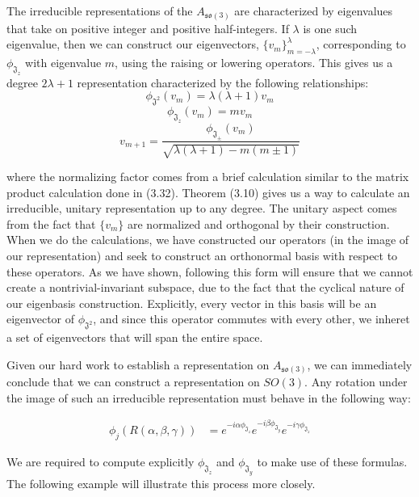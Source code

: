 \begin{theorem}
	The irreducible representations of the $A_{\mathfrak{so}(3)}$ are characterized by eigenvalues that take on positive integer and positive half-integers. If $\lambda$ is one such eigenvalue, then we can construct our eigenvectors, $\{v_m\}_{m=-\lambda}^\lambda$, corresponding to $\phi_{\mathfrak{J}_z}$ with eigenvalue $m$, using the raising or lowering operators. This gives us a degree $2\lambda +1$ representation characterized by the following relationships:
$$\phi_{\mathfrak{J}^2}(v_m) = \lambda(\lambda+1)v_m$$
$$\phi_{\mathfrak{J}_z}(v_m) =  mv_m$$ 
$$v_{m+1} =  \frac{\phi_{\mathfrak{J}_\pm}(v_m)}{\sqrt{\lambda(\lambda+1) - m(m\pm 1)}}$$
\end{theorem}
\noindent where the normalizing factor comes from a brief calculation similar to the matrix product calculation done in (3.32). Theorem (3.10) gives us a way to calculate an irreducible, unitary representation up to any degree. The unitary aspect comes from the fact that $\{v_m\}$ are normalized and orthogonal by their construction. When we do the calculations, we have constructed our operators (in the image of our representation) and seek to construct an orthonormal basis with respect to these operators. As we have shown, following this form will ensure that we cannot create a nontrivial-invariant subspace, due to the fact that the cyclical nature of our eigenbasis construction. Explicitly, every vector in this basis will be an eigenvector of $\phi_{\mathfrak{J^2}}$, and since this operator commutes with every other, we inheret a set of eigenvectors that will span the entire space.

Given our hard work to establish a representation on $A_{\mathfrak{so}(3)}$, we can immediately conclude that we can construct a representation on $SO(3)$. Any rotation under the image of such an irreducible representation must behave in the following way:

\begin{equation}
\begin{aligned}
	\phi_j(R(\alpha,\beta,\gamma)) &= e^{-i\alpha\phi_{\mathfrak{J}_z}}e^{-i\beta\phi_{\mathfrak{J}_y}}e^{-i\gamma\phi_{\mathfrak{J}_z}}	
\end{aligned}
\end{equation}

We are required to compute explicitly $\phi_{\mathfrak{J}_z}$ and $\phi_{\mathfrak{J}_y}$ to make use of these formulas. The following example will illustrate this process more closely.

